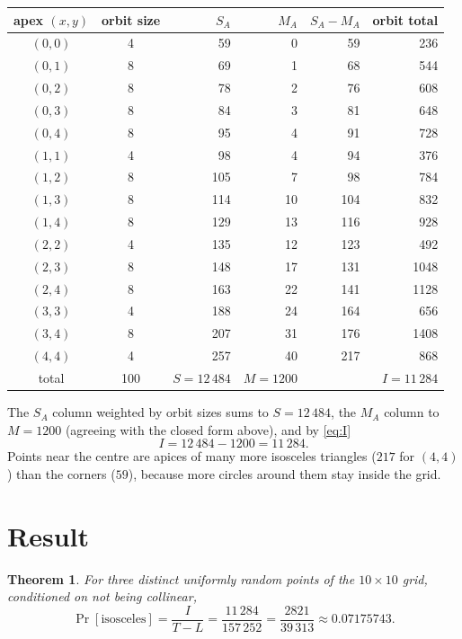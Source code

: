 \documentclass[11pt,a4paper]{article}
\newtheorem*{theorem*}{Theorem}
\theoremstyle{remark}
\begin{document}
\begin{center}
\begin{tabular}{ccrrrr}
\toprule
apex $(x,y)$ & orbit size & $S_A$ & $M_A$ & $S_A-M_A$ & orbit total \\
\midrule
$(0,0)$ & 4 &  59 &  0 &  59 &  236 \\
$(0,1)$ & 8 &  69 &  1 &  68 &  544 \\
$(0,2)$ & 8 &  78 &  2 &  76 &  608 \\
$(0,3)$ & 8 &  84 &  3 &  81 &  648 \\
$(0,4)$ & 8 &  95 &  4 &  91 &  728 \\
$(1,1)$ & 4 &  98 &  4 &  94 &  376 \\
$(1,2)$ & 8 & 105 &  7 &  98 &  784 \\
$(1,3)$ & 8 & 114 & 10 & 104 &  832 \\
$(1,4)$ & 8 & 129 & 13 & 116 &  928 \\
$(2,2)$ & 4 & 135 & 12 & 123 &  492 \\
$(2,3)$ & 8 & 148 & 17 & 131 & 1048 \\
$(2,4)$ & 8 & 163 & 22 & 141 & 1128 \\
$(3,3)$ & 4 & 188 & 24 & 164 &  656 \\
$(3,4)$ & 8 & 207 & 31 & 176 & 1408 \\
$(4,4)$ & 4 & 257 & 40 & 217 &  868 \\
\midrule
total   & 100 & $S=12\,484$ & $M=1200$ & & $I=11\,284$ \\
\bottomrule
\end{tabular}
\end{center}

The $S_A$ column weighted by orbit sizes sums to $S=12\,484$, the $M_A$ column to
$M=1200$ (agreeing with the closed form above), and by \eqref{eq:I}
\[
  I = 12\,484-1200 = 11\,284 .
\]
Points near the centre are apices of many more isosceles triangles ($217$ for
$(4,4)$) than the corners ($59$), because more circles around them stay inside
the grid.

\section{Result}

\begin{theorem*}
For three distinct uniformly random points of the $10\times10$ grid, conditioned on
not being collinear,
\[
  \Pr[\text{isosceles}]
  =\frac{I}{T-L}
  =\frac{11\,284}{157\,252}
  =\frac{2821}{39\,313}
  \approx 0.07175743 .
\]
\end{theorem*}
\end{document}
